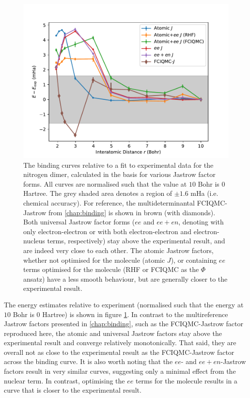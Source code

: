 \begin{figure}[htbp]
    \centering
    \includegraphics[width=\textwidth]{figures/universal/residuals}
    \caption{The binding curves relative to a fit to experimental data\supercite{leroyAccurate2006} for the nitrogen dimer, calculated in the \avtz basis for various Jastrow factor forms. All curves are normalised such that the value at $10$ Bohr is $0$ Hartree. The grey shaded area denotes a region of $\pm 1.6$ mHa (i.e. chemical accuracy). For reference, the multideterminantal FCIQMC-Jastrow from \autoref{chap:binding} is shown in brown (with diamonds). Both universal Jastrow factor forms ($ee$ and $ee+en$, denoting with only electron-electron or with both electron-electron and electron-nucleus terms, respectively) stay above the experimental result, and are indeed very close to each other. The atomic Jastrow factors, whether not optimised for the molecule (atomic $J$), or containing $ee$ terms optimised for the molecule (RHF or FCIQMC as the $\Phi$ ansatz) have a less smooth behaviour, but are generally closer to the experimental result. }
    \label{fig:binding-universal-experiment}
\end{figure}

The energy estimates relative to experiment (normalised such that the energy at $10$ Bohr is $0$ Hartree) is shown in figure \ref{fig:binding-universal-experiment}. In contrast to the multireference Jastrow factors presented in \autoref{chap:binding}, such as the FCIQMC-Jastrow factor reproduced here, the atomic and universal Jastrow factors stay above the experimental result and converge relatively monotonically. That said, they are overall not as close to the experimental result as the FCIQMC-Jastrow factor across the binding curve. It is also worth noting that the $ee$- and $ee+en$-Jastrow factors result in very similar curves, suggesting only a minimal effect from the nuclear term. In contrast, optimising the $ee$ terms for the molecule results in a curve that is closer to the experimental result. 

